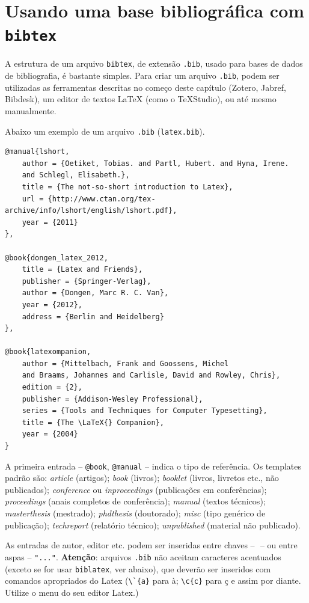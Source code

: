 \section{Usando uma base bibliográfica com \texttt{bibtex}}
\label{bibtex}

A estrutura de um arquivo \texttt{bibtex}, de extensão \texttt{.bib}, usado para bases de dados de bibliografia, é bastante simples. Para criar um arquivo \texttt{.bib}, podem ser utilizadas as ferramentas descritas no começo deste capítulo (Zotero, Jabref, Bibdesk), um editor de textos \LaTeX{} (como o TeXStudio), ou até mesmo manualmente.

Abaixo um exemplo de um arquivo \texttt{.bib} (\texttt{latex.bib}). \label{latex-bib}

\begin{verbatim}
@manual{lshort,
    author = {Oetiket, Tobias. and Partl, Hubert. and Hyna, Irene. 
    and Schlegl, Elisabeth.},
    title = {The not-so-short introduction to Latex},
    url = {http://www.ctan.org/tex-archive/info/lshort/english/lshort.pdf},
    year = {2011}
},

@book{dongen_latex_2012,
	title = {Latex and Friends},
	publisher = {Springer-Verlag},
	author = {Dongen, Marc R. C. Van},
	year = {2012},
	address = {Berlin and Heidelberg}
},

@book{latexompanion,
    author = {Mittelbach, Frank and Goossens, Michel 
    and Braams, Johannes and Carlisle, David and Rowley, Chris},
    edition = {2},
    publisher = {Addison-Wesley Professional},
    series = {Tools and Techniques for Computer Typesetting},
    title = {The \LaTeX{} Companion},
    year = {2004}
}

\end{verbatim}

A primeira entrada -- \verb+@book+, \verb+@manual+ -- indica o tipo de referência. Os templates padrão são: \textit{article} (artigos); \textit{book} (livros); \textit{booklet} (livros, livretos etc., não publicados); \textit{conference} ou \textit{inproceedings} (publicações em conferências); \textit{proceedings} (anais completos de conferência); \textit{manual} (textos técnicos); \textit{masterthesis} (mestrado); \textit{phdthesis} (doutorado); \textit{misc} (tipo genérico de publicação); \textit{techreport} (relatório técnico); \textit{unpublished} (material não publicado).

As entradas de autor, editor etc. podem ser inseridas entre chaves -- ${}$ -- ou entre aspas -- \verb+"..."+. 
\textbf{Atenção}: arquivos \texttt{.bib} não aceitam caracteres acentuados (exceto se for usar \texttt{bib\-la\-tex}, ver abaixo), que deverão ser inseridos com comandos apropriados do Latex (\verb+\`{a}+ para à; \verb+\c{c}+ para ç e assim por diante. Utilize o menu do seu editor Latex.)

